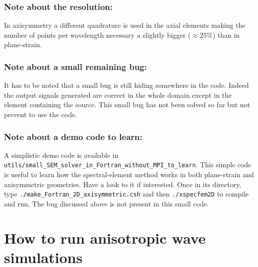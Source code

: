 \subsubsection*{Note about the resolution:}
In axisymmetry a different quadrature is used in the axial elements making the number of points per wavelength necessary a slightly
bigger ($\approx 25\%$) than in plane-strain.\newline


\subsubsection*{Note about a small remaining bug:}
It has to be noted that a small bug is still hiding somewhere in the code. Indeed the output signals generated are correct in the
whole domain except in the element containing the source. This small bug has not been solved so far but not prevent to use the code.\newline


\subsubsection*{Note about a demo code to learn:}
A simplistic demo code is available in \newline
\texttt{utils/small\_SEM\_solver\_in\_Fortran\_without\_MPI\_to\_learn}.
This simple code is useful to learn how the spectral-element method works in both plane-strain and axisymmetric geometries.
Have a look to it if interested. Once in its directory, type \texttt{./make\_Fortran\_2D\_axisymmetric.csh} and then \texttt{./xspecfem2D}
to compile and run. The bug discussed above is not present in this small code.


\section{How to run anisotropic wave simulations}

